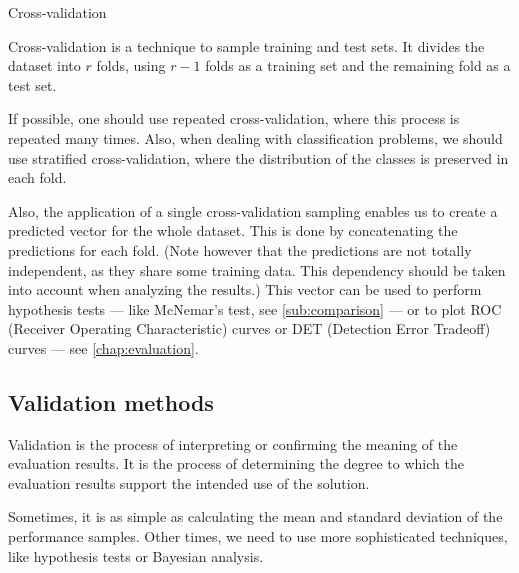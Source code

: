 \begin{figurebox}[label=fig:cross-validation]{Cross-validation}
  \centering
  \tcblower
  Cross-validation is a technique to sample training and test sets.  It divides the
  dataset into $r$ folds, using $r-1$ folds as a training set and the remaining fold as a
  test set.
\end{figurebox}

If possible, one should use repeated
cross-validation, where this process is repeated many times.  Also, when dealing with
classification problems, we should use stratified cross-validation, where the distribution
of the classes is preserved in each fold.

Also, the application of a single cross-validation sampling enables us to create a
predicted vector for the whole dataset.  This is done by concatenating the predictions for
each fold.  (Note however that the predictions are not totally independent, as they share
some training data.  This dependency should be taken into account when analyzing the
results.) This vector can be used to perform hypothesis tests --- like McNemar's test, see
\cref{sub:comparison} --- or to plot ROC (Receiver Operating Characteristic) curves or DET
(Detection Error Tradeoff) curves --- see \cref{chap:evaluation}.

\subsection{Validation methods}


Validation is the process of interpreting or confirming the meaning of the evaluation
results.  It is the process of determining the degree to which the evaluation results
support the intended use of the solution.

Sometimes, it is as simple as calculating the mean and standard deviation of the
performance samples.  Other times, we need to use more sophisticated techniques, like
hypothesis tests or Bayesian analysis.

